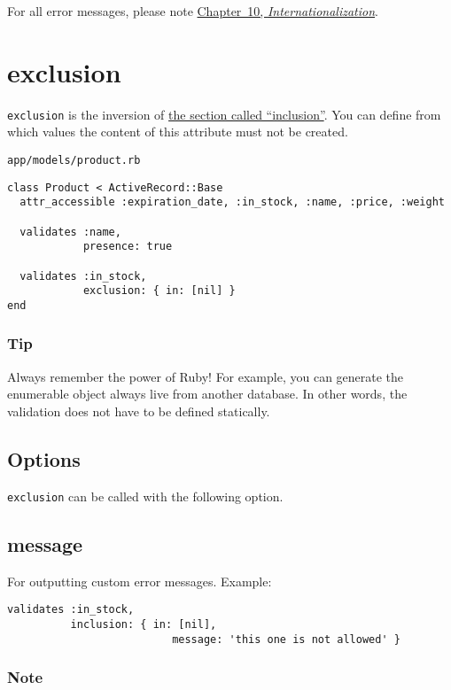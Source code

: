 \documentclass[a4paper]{book}
\newcounter{tab}[chapter]
\newcommand{\chap}[1]{\newpage\thispagestyle{empty}\chapter{#1}\label{chap:\thechapter}}
\begin{document}
For all error messages, please note \hyperref[i18n]{Chapter~10, \emph{Internationalization}}.

\chap{exclusion}\label{exclusion}

\texttt{exclusion} is the inversion of \hyperref[validatesux5finclusionux5fof]{the section called “inclusion”}. You can define from which values the content of this attribute must not be created.

\texttt{app/models/product.rb}

\begin{shaded}\begin{verbatim}
class Product < ActiveRecord::Base
  attr_accessible :expiration_date, :in_stock, :name, :price, :weight

  validates :name,
            presence: true

  validates :in_stock,
            exclusion: { in: [nil] }
end
\end{verbatim}\end{shaded}

\subsection{Tip}\label{tip-12}

Always remember the power of Ruby! For example, you can generate the enumerable object always live from another database. In other words, the validation does not have to be defined statically.

\section{Options}\label{options-7}

\texttt{exclusion} can be called with the following option.

\section{message}\label{message-1}

For outputting custom error messages. Example:

\begin{shaded}\begin{verbatim}
validates :in_stock,
          inclusion: { in: [nil],
                          message: 'this one is not allowed' }
\end{verbatim}\end{shaded}

\subsection{Note}\label{note-30}
\end{document}
